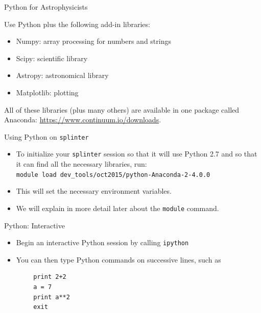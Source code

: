 \documentclass{beamer}
\begin{document}
\begin{frame}{Python for Astrophysicists}
  \begin{block}{Use Python plus the following add-in libraries:}
    \begin{itemize}
      \item Numpy: array processing for numbers and strings
      \item Scipy: scientific library
      \item Astropy: astronomical library
      \item Matplotlib: plotting
    \end{itemize}
  \end{block}
  \begin{block}{All of these libraries (plus many others) are available in one package called Anaconda:}
    \url{https://www.continuum.io/downloads}.
  \end{block}
\end{frame}

\begin{frame}{Using Python on \texttt{splinter}}
  \begin{itemize}
    \item To initialize your \texttt{splinter} session so that it will use Python 2.7 and so that it can find all the necessary libraries, run: \\
    \texttt{module~load~dev\_tools/oct2015/python-Anaconda-2-4.0.0}
    \item This will set the necessary environment variables.
    \item We will explain in more detail later about the \texttt{module} command.
  \end{itemize}
\end{frame}

\begin{frame}[fragile]{Python: Interactive}
  \begin{itemize}
    \item Begin an interactive Python session by calling \texttt{ipython}
    \item You can then type Python commands on successive lines, such as
  \end{itemize}
  \begin{lstlisting}
        print 2+2
        a = 7
        print a**2
        exit
  \end{lstlisting}
\end{frame}
\end{document}
